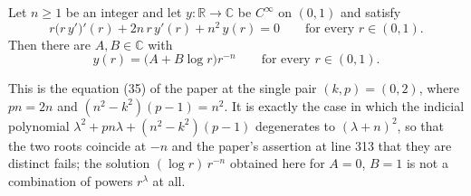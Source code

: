 \begin{lemma}
Let $n\ge1$ be an integer and let $y\colon\mathbb{R}\to\mathbb{C}$ be
$C^\infty$ on $(0,1)$ and satisfy
\[
  r\bigl(r\,y'\bigr)'(r)+2n\,r\,y'(r)+n^2\,y(r)=0
  \qquad\text{for every }r\in(0,1).
\]
Then there are $A,B\in\mathbb{C}$ with
\[
  y(r)=\bigl(A+B\log r\bigr)r^{-n}\qquad\text{for every }r\in(0,1).
\]

This is the equation (35) of the paper at the single pair $(k,p)=(0,2)$, where
$pn=2n$ and $(n^2-k^2)(p-1)=n^2$.  It is exactly the case in which the
indicial polynomial $\lambda^2+pn\lambda+(n^2-k^2)(p-1)$ degenerates to
$(\lambda+n)^2$, so that the two roots coincide at $-n$ and the paper's
assertion at line 313 that they are distinct fails; the solution
$(\log r)\,r^{-n}$ obtained here for $A=0$, $B=1$ is not a combination of
powers $r^{\lambda}$ at all.
\end{lemma}
